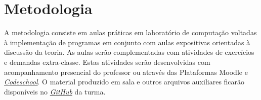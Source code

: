 \section{Metodologia}

A metodologia consiste em aulas práticas em laboratório de computação voltadas à implementação de programas em conjunto com aulas expositivas orientadas à discussão da teoria. As aulas serão complementadas com atividades de exercícios e demandas extra-classe. Estas atividades serão desenvolvidas com acompanhamento presencial do professor ou através das Plataformas Moodle e \href{http://codeschool.lappis.rocks}{\textit{Codeschool}}. O material
produzido em sala e outros arquivos auxiliares ficarão disponíveis no \href{https://github.com/fabiommendes/numericos-pub}{\textit{GitHub}} da turma.
